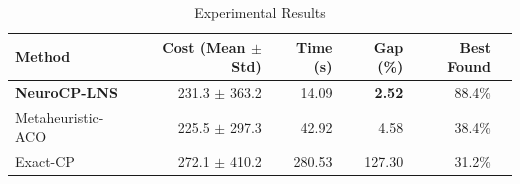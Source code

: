 \begin{table}[ht]
\centering
\caption{Experimental Results}
\label{tab:results}
\begin{tabular}{lrrrrr}
\toprule
Method & Cost (Mean $\pm$ Std) & Time (s) & Gap (\%) & Best Found \\
\midrule
\textbf{NeuroCP-LNS} & 231.3 $\pm$ 363.2 & 14.09 & \textbf{2.52} & 88.4\% \\
Metaheuristic-ACO & 225.5 $\pm$ 297.3 & 42.92 & 4.58 & 38.4\% \\
Exact-CP & 272.1 $\pm$ 410.2 & 280.53 & 127.30 & 31.2\% \\
\bottomrule
\end{tabular}
\end{table}